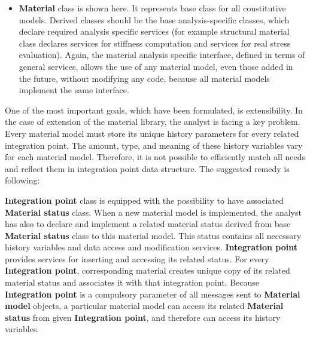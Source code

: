 \documentclass[a4paper]{article}
\newcommand{\class}[1]{{\bf #1}}
\begin{document}
\begin{itemize}
\item
\class{Material} class is shown here. It represents base class for all
constitutive models. Derived classes should be the base
analysis-specific classes, which declare required analysis
specific services (for example structural material class declares
services for stiffness computation and services for real stress
evaluation). Again, the material analysis specific interface, defined
in terms of general services, allows the use of any material model, even
those added in the future, without modifying any code, because all material
models implement the same interface.
\end{itemize}

One of the most important goals, which have been formulated, is
extensibility. In the case of extension of the material library, the
analyst is facing  a key problem. Every material model must store
its unique history parameters for every related integration point. The
amount, type, and meaning of these history variables vary for each
material model. Therefore, it is not possible to efficiently
match all needs and reflect them in integration point data
structure. The suggested remedy is following:

\class{Integration point}  class is equipped with the possibility to have
associated \class{Material status} class. When a new material model is
implemented, the analyst has also to declare and implement a related
material status derived from base
\class{Material status} class to this material model. This status contains all necessary
history variables and data access and modification
services. \class{Integration point} provides services for inserting and
accessing its related status. For every  \class{Integration point},
corresponding material creates unique copy of its related material
status and associates it with that integration point. Because
\class{Integration point} is a compulsory parameter of all messages sent to
\class{Material model} objects, a particular material model can access its
related \class{Material status} from given \class{Integration point}, and therefore can access its
history variables. 



\end{document}
